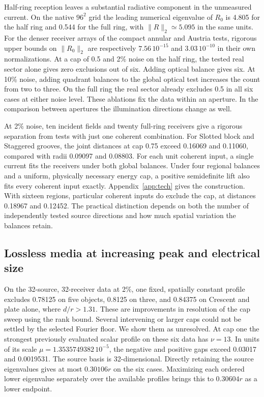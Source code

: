 Half-ring reception leaves a substantial radiative component in the unmeasured current. On the native $96^2$ grid the leading numerical eigenvalue of $R_0$ is 4.805 for the half ring and 0.544 for the full ring, with $\|R\|_2\simeq5.095$ in the same units. For the denser receiver arrays of the compact annular and Austria tests, rigorous upper bounds on $\|R_0\|_2$ are respectively $7.56\,10^{-15}$ and $3.03\,10^{-10}$ in their own normalizations. At a cap of 0.5 and 2\% noise on the half ring, the tested real sector alone gives zero exclusions out of six. Adding optical balance gives six. At 10\% noise, adding quadrant balances to the global optical test increases the count from two to three. On the full ring the real sector already excludes 0.5 in all six cases at either noise level. These ablations fix the data within an aperture. In the comparison between apertures the illumination directions change as well.

At 2\% noise, ten incident fields and twenty full-ring receivers give a rigorous separation from tests with just one coherent combination. For Slotted block and Staggered grooves, the joint distances at cap 0.75 exceed 0.16069 and 0.11060, compared with radii 0.09097 and 0.08803. For each unit coherent input, a single current fits the receivers under both global balances. Under four regional balances and a uniform, physically necessary energy cap, a positive semidefinite lift also fits every coherent input exactly. Appendix~\ref{app:tech} gives the construction. With sixteen regions, particular coherent inputs do exclude the cap, at distances 0.18967 and 0.12452. The practical distinction depends on both the number of independently tested source directions and how much spatial variation the balances retain.

\subsection{Lossless media at increasing peak and electrical size}

On the 32-source, 32-receiver data at 2\%, one fixed, spatially constant profile excludes 0.78125 on five objects, 0.8125 on three, and 0.84375 on Crescent and plate alone, where $d/r>1.31$. These are improvements in resolution of the cap sweep using the rank bound. Several intervening or larger caps could not be settled by the selected Fourier floor. We show them as unresolved. At cap one the strongest previously evaluated scalar profile on these six data has $\nu=13$. In units of its scale $\mu=1.3535749382\,10^{-5}$, the negative and positive gaps exceed 0.03017 and 0.0019531. The source basis is 32-dimensional. Directly retaining the source eigenvalues gives at most $0.30106r$ on the six cases. Maximizing each ordered lower eigenvalue separately over the available profiles brings this to $0.30604r$ as a lower endpoint.

